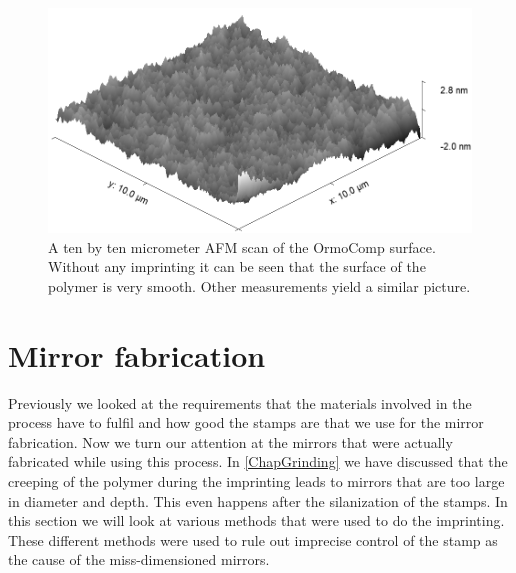 \begin{figure}[H]
	\includegraphics[scale=0.5]{source/OrmoComp_rms}
	\caption{A ten by ten micrometer AFM scan of the OrmoComp surface. Without any imprinting it can be seen that the surface of the polymer is very smooth. Other measurements yield a similar picture.}
\end{figure}

\section{Mirror fabrication}\label{ChapMirrorFab}
Previously we looked at the requirements that the materials involved in the process have to fulfil and how good the stamps are that we use for the mirror fabrication. Now we turn our attention at the mirrors that were actually fabricated while using this process. In \autoref{ChapGrinding} we have discussed that the creeping of the polymer during the imprinting leads to mirrors that are too large in diameter and depth. This even happens after the silanization of the stamps. In this section we will look at various methods that were used to do the imprinting. These different methods were used to rule out imprecise control of the stamp as the cause of the miss-dimensioned mirrors.

